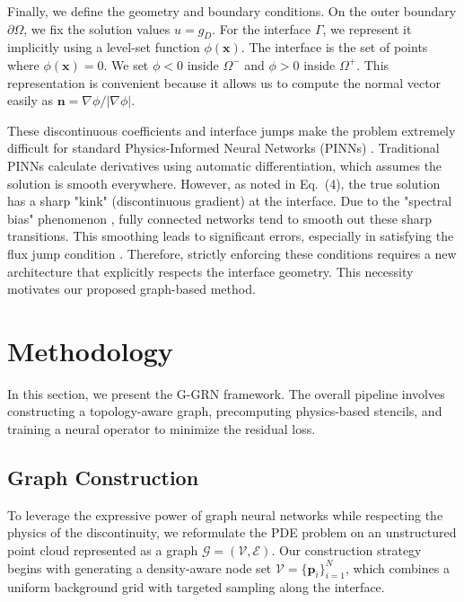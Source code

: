 \documentclass[11pt]{article}
\theoremstyle{definition}
\theoremstyle{remark}
\theoremstyle{plain}
\begin{document}
Finally, we define the geometry and boundary conditions. On the outer boundary $\partial\Omega$, we fix the solution values $u = g_D$. For the interface $\Gamma$, we represent it implicitly using a level-set function $\phi(\mathbf{x})$. The interface is the set of points where $\phi(\mathbf{x}) = 0$. We set $\phi < 0$ inside $\Omega^-$ and $\phi > 0$ inside $\Omega^+$. This representation is convenient because it allows us to compute the normal vector easily as $\mathbf{n} = \nabla\phi / |\nabla\phi|$.

These discontinuous coefficients and interface jumps make the problem extremely difficult for standard Physics-Informed Neural Networks (PINNs) \cite{raissi2019physics}. Traditional PINNs calculate derivatives using automatic differentiation, which assumes the solution is smooth everywhere. However, as noted in Eq.~(4), the true solution has a sharp "kink" (discontinuous gradient) at the interface. Due to the "spectral bias" phenomenon \cite{rahaman2019spectral}, fully connected networks tend to smooth out these sharp transitions. This smoothing leads to significant errors, especially in satisfying the flux jump condition \cite{hu2022discontinuity}. Therefore, strictly enforcing these conditions requires a new architecture that explicitly respects the interface geometry. This necessity motivates our proposed graph-based method.

\section{Methodology}
\label{sec:method}

In this section, we present the G-GRN framework. The overall pipeline involves constructing a topology-aware graph, precomputing physics-based stencils, and training a neural operator to minimize the residual loss.

\subsection{Graph Construction}
\label{sec:graph_construction}

To leverage the expressive power of graph neural networks while respecting the physics of the discontinuity, we reformulate the PDE problem on an unstructured point cloud represented as a graph $\mathcal{G} = (\mathcal{V}, \mathcal{E})$. Our construction strategy begins with generating a density-aware node set $\mathcal{V} = \{\mathbf{p}_i\}_{i=1}^{N}$, which combines a uniform background grid with targeted sampling along the interface.
\end{document}
